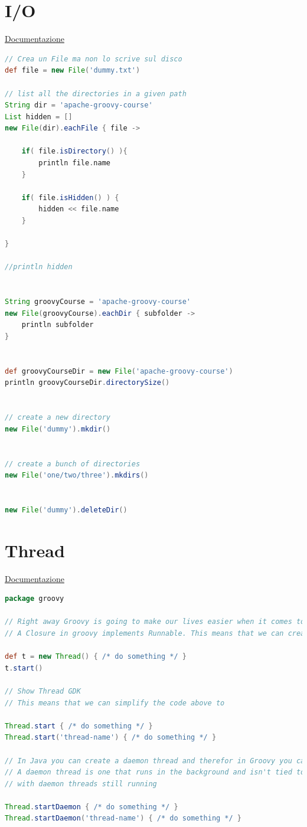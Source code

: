 \documentclass[11pt,a4paper]{book}
\begin{document}
\section{I/O}
\href{https://docs.groovy-lang.org/latest/html/groovy-jdk/java/io/File.html}{Documentazione}

\begin{lstlisting}[language = groovy]
// Crea un File ma non lo scrive sul disco
def file = new File('dummy.txt')

// list all the directories in a given path
String dir = 'apache-groovy-course'
List hidden = []
new File(dir).eachFile { file ->

    if( file.isDirectory() ){
        println file.name
    }

    if( file.isHidden() ) {
        hidden << file.name
    }

}

//println hidden


String groovyCourse = 'apache-groovy-course'
new File(groovyCourse).eachDir { subfolder ->
    println subfolder
}


def groovyCourseDir = new File('apache-groovy-course')
println groovyCourseDir.directorySize()


// create a new directory
new File('dummy').mkdir()


// create a bunch of directories
new File('one/two/three').mkdirs()


new File('dummy').deleteDir()
\end{lstlisting}

\section{Thread}
\href{https://docs.groovy-lang.org/latest/html/groovy-jdk/java/lang/Thread.html}{Documentazione}

\begin{lstlisting}[language = groovy]
package groovy

// Right away Groovy is going to make our lives easier when it comes to creating threads
// A Closure in groovy implements Runnable. This means that we can create a new thread pretty easily

def t = new Thread() { /* do something */ }
t.start()

// Show Thread GDK
// This means that we can simplify the code above to

Thread.start { /* do something */ }
Thread.start('thread-name') { /* do something */ }

// In Java you can create a daemon thread and therefor in Groovy you can do the same.
// A daemon thread is one that runs in the background and isn't tied to a program. This means a program can exit
// with daemon threads still running

Thread.startDaemon { /* do something */ }
Thread.startDaemon('thread-name') { /* do something */ }
\end{lstlisting}
\end{document}
